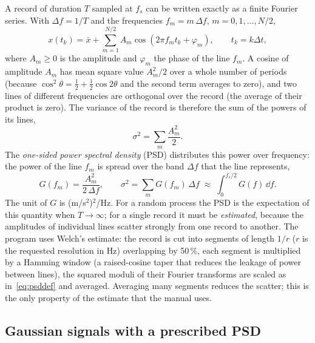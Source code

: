 A record of duration $T$ sampled at $f_s$ can be written exactly as a finite Fourier series. With
$\Delta f = 1/T$ and the frequencies $f_m = m\,\Delta f$, $m = 0,1,\dots,N/2$,
\begin{equation}\label{eq:fourier}
  x(t_k) = \bar x + \sum_{m=1}^{N/2} A_m \cos(2\pi f_m t_k + \varphi_m),\qquad t_k = k\Delta t ,
\end{equation}
where $A_m\ge0$ is the amplitude and $\varphi_m$ the phase of the line $f_m$. A cosine of amplitude
$A_m$ has mean square value $A_m^2/2$ over a whole number of periods (because $\cos^2\theta =
\tfrac12 + \tfrac12\cos2\theta$ and the second term averages to zero), and two lines of different
frequencies are orthogonal over the record (the average of their product is zero). The variance of
the record is therefore the sum of the powers of its lines,
\begin{equation}\label{eq:parseval}
  \sigma^2 = \sum_{m} \frac{A_m^2}{2}.
\end{equation}
The \emph{one-sided power spectral density} (PSD) distributes this power over frequency: the power of
the line $f_m$ is spread over the band $\Delta f$ that the line represents,
\begin{equation}\label{eq:psddef}
  G(f_m) = \frac{A_m^2}{2\,\Delta f}, \qquad \sigma^2 = \sum_m G(f_m)\,\Delta f \;\approx\; \int_0^{f_s/2} G(f)\,\dd f .
\end{equation}
The unit of $G$ is (m/s$^2$)$^2$/Hz. For a random process the PSD is the expectation of this quantity
when $T\to\infty$; for a single record it must be \emph{estimated}, because the amplitudes of
individual lines scatter strongly from one record to another. The program uses Welch's estimate:
the record is cut into segments of length $1/r$ ($r$ is the requested resolution in Hz) overlapping
by 50\,\%, each segment is multiplied by a Hamming window (a raised-cosine taper that reduces the
leakage of power between lines), the squared moduli of their Fourier
transforms are scaled as in~\eqref{eq:psddef} and averaged. Averaging many segments reduces the
scatter; this is the only property of the estimate that the manual uses.

\subsection{Gaussian signals with a prescribed PSD}\label{sec:multisine}

